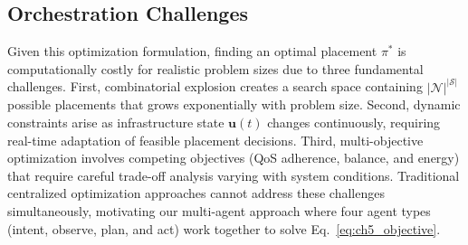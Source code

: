 \subsection{Orchestration Challenges}
\label{subsec:ch5_orchestration_challenges}

Given this optimization formulation, finding an optimal placement $\pi^*$ is computationally costly for realistic problem sizes due to three fundamental challenges. First, combinatorial explosion creates a search space containing $|\mathcal{N}|^{|\mathcal{S}|}$ possible placements that grows exponentially with problem size. Second, dynamic constraints arise as infrastructure state $\mathbf{u}(t)$ changes continuously, requiring real-time adaptation of feasible placement decisions. Third, multi-objective optimization involves competing objectives (\ac{QoS} adherence, balance, and energy) that require careful trade-off analysis varying with system conditions. Traditional centralized optimization approaches cannot address these challenges simultaneously, motivating our multi-agent approach where four agent types (intent, observe, plan, and act) work together to solve Eq.~\ref{eq:ch5_objective}.